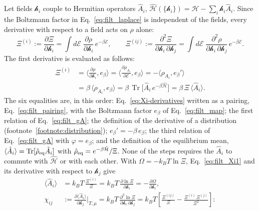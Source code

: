 \documentclass[10pt,a4paper]{article}
\theoremstyle{plain}
\newcommand{\Tr}{\operatorname{Tr}}
\newcommand{\hfield}{\mathscr{h}}  %
\newcommand{\enrg}{\mathcal{E}}  %
\begin{document}
Let fields $\hfield_i$ couple to Hermitian operators $\hat A_i$,
$ \hat{\mathcal{H}}(\{\hfield_i\}) = \hat{\mathcal{H}} - \sum_i\hfield_i\hat A_i $.
Since the Boltzmann factor in Eq.~\eqref{eq:filt_laplace} is independent of
the fields, every derivative with respect to a field acts on $ \rho $ alone:
\begin{equation}\label{eq:Xi-derivatives}
  \Xi^{(i)} := \frac{\partial\Xi}{\partial \hfield_i}
  = \int d\enrg\;\frac{\partial\rho}{\partial \hfield_i}\,e^{-\beta\enrg} ,
  \qquad
  \Xi^{(ij)} := \frac{\partial^{2}\Xi}{\partial \hfield_i\,\partial \hfield_j}
  = \int d\enrg\;\frac{\partial^{2}\rho}{\partial \hfield_i\,\partial \hfield_j}\,e^{-\beta\enrg} .
\end{equation}
The first derivative is evaluated as follows:
\begin{equation}\label{eq:filt_Xi1}
\begin{aligned}
  \Xi^{(i)}
  &=\Big\langle\frac{\partial\rho}{\partial\hfield_i},e_\beta\Big\rangle
  =\Big\langle\frac{\partial\rho_{A_i}}{\partial\enrg},e_\beta\Big\rangle
  =-\langle\rho_{A_i},e_\beta'\rangle
  \\
  &=\beta\,\langle\rho_{A_i},e_\beta\rangle
  =\beta\,\Tr\big[\hat A_i\,e^{-\beta\hat{\mathcal H}}\big]
  =\beta\,\Xi\,\langle\hat A_i\rangle .
\end{aligned}
\end{equation}
The six equalities are, in this order: Eq.~\eqref{eq:Xi-derivatives} written
as a pairing, Eq.~\eqref{eq:filt_pairing}, with the Boltzmann factor $e_\beta$
of Eq.~\eqref{eq:filt_map}; the first relation of Eq.~\eqref{eq:filt_gA};
the definition of the derivative of a distribution
(footnote~\ref{footnote:distribution}); $e_\beta'=-\beta\,e_\beta$; the third
relation of Eq.~\eqref{eq:filt_gA} with $\varphi=e_\beta$; and the definition
of the equilibrium mean,
$\langle\hat A_i\rangle=\Tr[\hat\rho_{\rm eq}\hat A_i]$ with
$\hat\rho_{\rm eq}=e^{-\beta\hat{\mathcal H}}/\Xi$. None of the steps
requires the $\hat A_i$ to commute with $\hat{\mathcal H}$ or with each
other.
With $\Omega=-k_BT\ln\Xi$, Eq.~\eqref{eq:filt_Xi1} and its derivative with
respect to $\hfield_j$ give
\begin{equation}\label{eq:filt_param}
\begin{aligned}
  \langle\hat A_i\rangle &= k_BT\,\frac{\Xi^{(i)}}{\Xi}
  =k_BT\,\frac{\partial\ln\Xi}{\partial\hfield_i}
  =-\frac{\partial\Omega}{\partial\hfield_i} ,
  \\
  \chi_{ij} &:= \frac{\partial\langle\hat A_i\rangle}{\partial \hfield_j}\bigg|_{T,\mu}
  =k_BT\,\frac{\partial^{2}\ln\Xi}{\partial\hfield_i\,\partial\hfield_j}
  = k_BT\left[\frac{\Xi^{(ij)}}{\Xi} - \frac{\Xi^{(i)}\,\Xi^{(j)}}{\Xi^{2}}\right] :
\end{aligned}
\end{equation}
\end{document}
